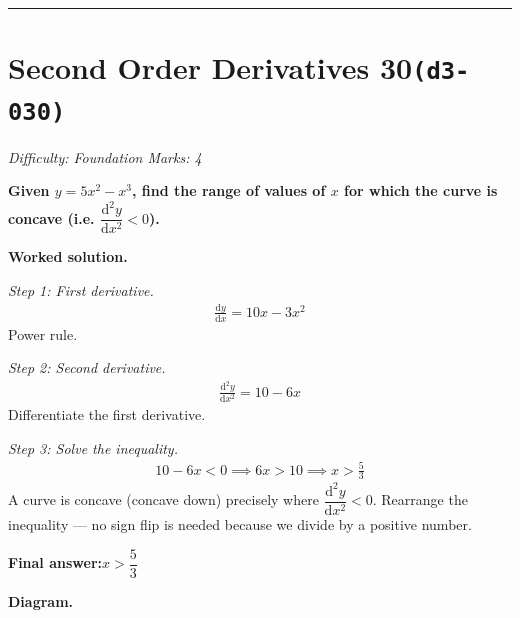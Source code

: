 \documentclass[11pt]{article}
\newcommand{\question}[1]{\par\medskip\noindent\textbf{#1}\par}
\begin{document}
\medskip\hrule

\section*{Second Order Derivatives 30\quad\small\texttt{(d3-030)}}
\textit{Difficulty: Foundation \quad\textbar\quad Marks: 4}

\question{Given \( y = 5x^2 - x^3 \), find the range of values of \( x \) for which the curve is concave (i.e. \( \dfrac{\mathrm{d}^2y}{\mathrm{d}x^2} < 0 \)).}

\textbf{Worked solution.}

\textit{Step 1: First derivative.}
\[\begin{gathered}
\frac{\mathrm{d}y}{\mathrm{d}x} = 10x - 3x^2
\end{gathered}\]
Power rule.

\textit{Step 2: Second derivative.}
\[\begin{gathered}
\frac{\mathrm{d}^2y}{\mathrm{d}x^2} = 10 - 6x
\end{gathered}\]
Differentiate the first derivative.

\textit{Step 3: Solve the inequality.}
\[\begin{gathered}
10 - 6x < 0 \implies 6x > 10 \implies x > \tfrac{5}{3}
\end{gathered}\]
A curve is concave (concave down) precisely where \( \dfrac{\mathrm{d}^2y}{\mathrm{d}x^2} < 0 \). Rearrange the inequality --- no sign flip is needed because we divide by a positive number.

\begin{answerbox}
\textbf{Final answer:}\quad \(\displaystyle  x > \dfrac{5}{3} \)
\end{answerbox}
\textbf{Diagram.}
\end{document}
